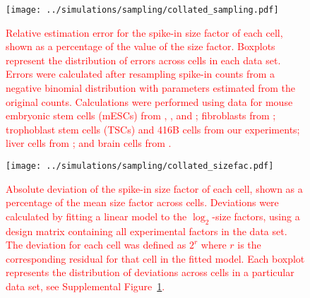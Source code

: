 \documentclass{article}
\newcommand\revised[1]{\textcolor{red}{#1}}
\begin{document}
\begin{figure}
    \begin{center}
        \texttt{[image: ../simulations/sampling/collated\_sampling.pdf]}
    \end{center}
    \caption{\revised{Relative estimation error for the spike-in size factor of each cell, shown as a percentage of the value of the size factor.
        Boxplots represent the distribution of errors across cells in each data set.
        Errors were calculated after resampling spike-in counts from a negative binomial distribution with parameters estimated from the original counts.
        Calculations were performed using data for mouse embryonic stem cells (mESCs) from \cite{islam2014quantitative},
        \cite{buettner2015computational}, \cite{grun2014validation} and \cite{kolod2015single};  
        fibroblasts from \cite{hashimshony2016celseq2};
        trophoblast stem cells (TSCs) and 416B cells from our experiments;
        liver cells from \cite{scialdone2015computational};
        and brain cells from \cite{zeisel2015brain}. }
    }
    \label{fig:sampling}
\end{figure}

\begin{figure}
    \begin{center}
        \texttt{[image: ../simulations/sampling/collated\_sizefac.pdf]}
    \end{center}
    \caption{\revised{Absolute deviation of the spike-in size factor of each cell, shown as a percentage of the mean size factor across cells.
        Deviations were calculated by fitting a linear model to the $\log_2$-size factors, using a design matrix containing all experimental factors in the data set.
        The deviation for each cell was defined as $2^r$ where $r$ is the corresponding residual for that cell in the fitted model.
    Each boxplot represents the distribution of deviations across cells in a particular data set, see Supplemental Figure~\ref{fig:sampling}.}
    }
\end{figure}
\end{document}
